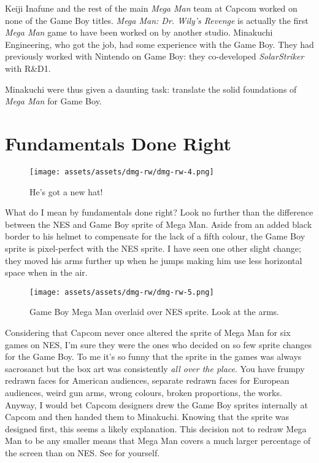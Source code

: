 \documentclass{book}
\begin{document}
Keiji Inafune and the rest of the main \emph{Mega Man} team at Capcom worked on none of the Game Boy titles. \emph{Mega Man: Dr. Wily’s Revenge} is actually the first \emph{Mega Man} game to have been worked on by another studio. Minakuchi Engineering, who got the job, had some experience with the Game Boy. They had previously worked with Nintendo on Game Boy: they co-developed \emph{SolarStriker} with R\&D1.

Minakuchi were thus given a daunting task: translate the solid foundations of \emph{Mega Man} for Game Boy.

\FloatBarrier\needspace{10mm}\section*{Fundamentals Done Right}\nopagebreak[4]

\begin{figure}[hbt]
\vskip 10pt
\centering \texttt{[image: assets/assets/dmg-rw/dmg-rw-4.png]}\par\pagetwodescription He’s got a new hat!
\vskip 6pt
\end{figure}
What do I mean by fundamentals done right? Look no further than the difference between the NES and Game Boy sprite of Mega Man. Aside from an added black border to his helmet to compensate for the lack of a fifth colour, the Game Boy sprite is pixel-perfect with the NES sprite. I have seen one other slight change; they moved his arms further up when he jumps making him use less horizontal space when in the air.

\begin{figure}[hbt]
\vskip 10pt
\centering \texttt{[image: assets/assets/dmg-rw/dmg-rw-5.png]}\par\pagetwodescription Game Boy Mega Man overlaid over NES sprite. Look at the arms.
\vskip 6pt
\end{figure}
Considering that Capcom never once altered the sprite of Mega Man for six games on NES, I’m sure they were the ones who decided on so few sprite changes for the Game Boy. To me it’s so funny that the sprite in the games was always sacrosanct but the box art was consistently \emph{all over the place}. You have frumpy redrawn faces for American audiences, separate redrawn faces for European audiences, weird gun arms, wrong colours, broken proportions, the works. Anyway, I would bet Capcom designers drew the Game Boy sprites internally at Capcom and then handed them to Minakuchi. Knowing that the sprite was designed first, this seems a likely explanation. This decision not to redraw Mega Man to be any smaller means that Mega Man covers a much larger percentage of the screen than on NES. See for yourself.
\end{document}
